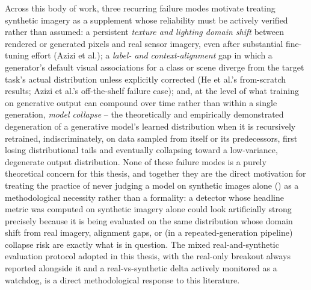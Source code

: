 Across this body of work, three recurring failure modes motivate treating synthetic imagery as a supplement whose reliability must be actively verified rather than assumed: a persistent \textit{texture and lighting domain shift} between rendered or generated pixels and real sensor imagery, even after substantial fine-tuning effort (Azizi et al.); a \textit{label- and context-alignment} gap in which a generator's default visual associations for a class or scene diverge from the target task's actual distribution unless explicitly corrected (He et al.'s from-scratch results; Azizi et al.'s off-the-shelf failure case); and, at the level of what training on generative output can compound over time rather than within a single generation, \textit{model collapse} \cite{shumailovAIModelsCollapse2024} -- the theoretically and empirically demonstrated degeneration of a generative model's learned distribution when it is recursively retrained, indiscriminately, on data sampled from itself or its predecessors, first losing distributional tails and eventually collapsing toward a low-variance, degenerate output distribution. None of these failure modes is a purely theoretical concern for this thesis, and together they are the direct motivation for treating the practice of never judging a model on synthetic images alone () as a methodological necessity rather than a formality: a detector whose headline metric was computed on synthetic imagery alone could look artificially strong precisely because it is being evaluated on the same distribution whose domain shift from real imagery, alignment gaps, or (in a repeated-generation pipeline) collapse risk are exactly what is in question. The mixed real-and-synthetic evaluation protocol adopted in this thesis, with the real-only breakout always reported alongside it and a real-vs-synthetic delta actively monitored as a watchdog, is a direct methodological response to this literature.
